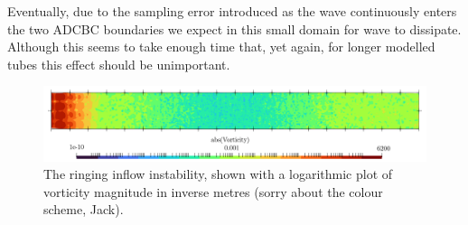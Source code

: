 Eventually, due to the sampling error introduced as the wave continuously enters the two ADCBC boundaries we expect in this small domain for wave to dissipate. Although this seems to take enough time that, yet again, for longer modelled tubes this effect should be unimportant.

\iffalse
\begin{figure}[t]
\centering
\includegraphics[scale=0.30]{assets/graphs/u-inflow-instab.png}
\caption{The ringing inflow instability, shown with a logarithmic plot of vorticity magnitude in inverse metres (sorry about the colour scheme, Jack).}
\label{fig:inflow-instab}
\end{figure}

